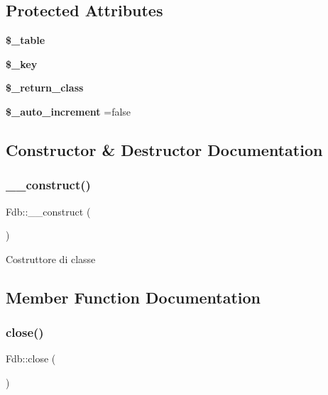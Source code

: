 \subsection*{Protected Attributes}
\begin{DoxyCompactItemize}
\item 
\mbox{\label{class_fdb_a111324c9e65a73a25fb594b089120156}} 
{\bfseries \$\+\_\+table}
\item 
\mbox{\label{class_fdb_a5267b56b473148163b543a2e68397b18}} 
{\bfseries \$\+\_\+key}
\item 
\mbox{\label{class_fdb_a29d9b5e7bb94f742d74bc1c7da8aa3a6}} 
{\bfseries \$\+\_\+return\+\_\+class}
\item 
\mbox{\label{class_fdb_a2b76251140e4651f3a3cfae5145e8747}} 
{\bfseries \$\+\_\+auto\+\_\+increment} =false
\end{DoxyCompactItemize}


\subsection{Constructor \& Destructor Documentation}
\mbox{\label{class_fdb_a7d9667ce13aa13c0136744d8e21f5f45}} 
\subsubsection{\texorpdfstring{\+\_\+\+\_\+construct()}{\_\_construct()}}
{\footnotesize\ttfamily Fdb\+::\+\_\+\+\_\+construct (\begin{DoxyParamCaption}{ }\end{DoxyParamCaption})}

Costruttore di classe 

\subsection{Member Function Documentation}
\mbox{\label{class_fdb_a39d2934cd845934b97c4935cca62eaf5}} 
\subsubsection{\texorpdfstring{close()}{close()}}
{\footnotesize\ttfamily Fdb\+::close (\begin{DoxyParamCaption}{ }\end{DoxyParamCaption})}

